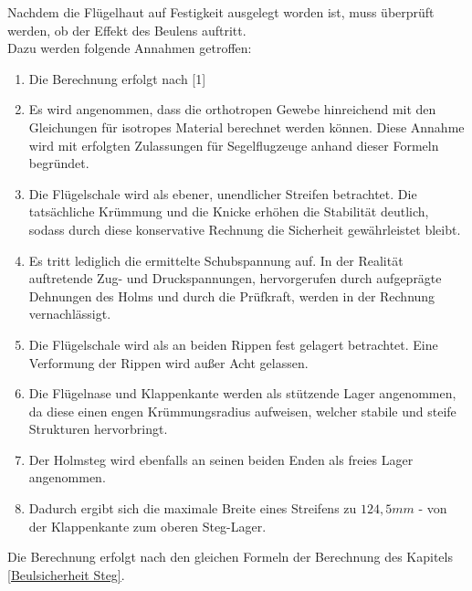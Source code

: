 Nachdem die Flügelhaut auf Festigkeit ausgelegt worden ist, muss überprüft werden, ob der Effekt des Beulens auftritt.\\

\noindent Dazu werden folgende Annahmen getroffen:

\begin{enumerate}
	\item Die Berechnung erfolgt nach [1]
	\item Es wird angenommen, dass die orthotropen Gewebe hinreichend mit den Gleichungen für isotropes Material berechnet werden können. Diese Annahme wird mit erfolgten Zulassungen für Segelflugzeuge anhand dieser Formeln begründet.
	\item Die Flügelschale wird als ebener, unendlicher Streifen betrachtet. Die tatsächliche Krümmung und die Knicke erhöhen die Stabilität deutlich, sodass durch diese konservative Rechnung die Sicherheit gewährleistet bleibt.
	\item Es tritt lediglich die ermittelte Schubspannung auf. In der Realität auftretende Zug- und Druckspannungen, hervorgerufen durch aufgeprägte Dehnungen des Holms und durch die Prüfkraft, werden in der Rechnung vernachlässigt.
	\item Die Flügelschale wird als an beiden Rippen fest gelagert betrachtet. Eine Verformung der Rippen wird außer Acht gelassen.
	\item Die Flügelnase und Klappenkante werden als stützende Lager angenommen, da diese einen engen Krümmungsradius aufweisen, welcher stabile und steife Strukturen hervorbringt.
	\item Der Holmsteg wird ebenfalls an seinen beiden Enden als freies Lager angenommen.
	\item Dadurch ergibt sich die maximale Breite eines Streifens zu $124,5 mm$ - von der Klappenkante zum oberen Steg-Lager.
\end{enumerate}

\noindent Die Berechnung erfolgt nach den gleichen Formeln der Berechnung des Kapitels \ref{Beulsicherheit Steg}.\\

